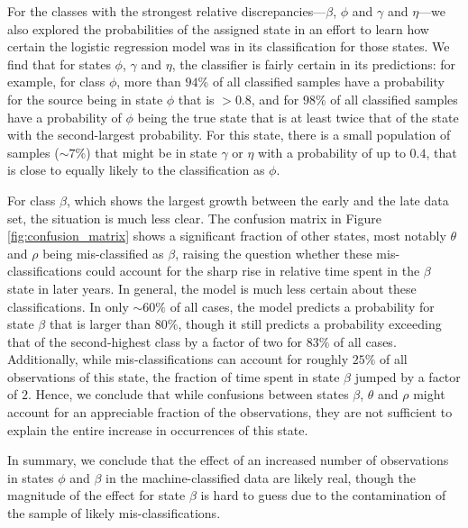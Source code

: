 \documentclass[fleqn,usenatbib]{mnras}
\begin{document}
For the classes with the strongest relative discrepancies---$\beta$, $\phi$ and $\gamma$ and $\eta$---we also explored the probabilities of the assigned state in an 
effort to learn how certain the logistic regression model was in its classification for those states. We find that for states $\phi$, $\gamma$ and $\eta$, the classifier is 
fairly certain in its predictions: for example, for class $\phi$, more than $94\%$ of all classified samples have a probability for the source being in state $\phi$ that is 
$>0.8$, and for $98\%$ of all classified samples have a probability of $\phi$ being the true state that is at least twice that of the state with the second-largest 
probability. For this state, there is a small population of samples ($\sim 7\%$) that might be in state $\gamma$ or $\eta$ with a probability of up to $0.4$, that is close to equally likely to the classification as $\phi$. 

For class $\beta$, which shows the largest growth between the early and the late data set, the situation is much less clear. The confusion matrix in Figure \ref{fig:confusion_matrix} shows a significant fraction of other states, most notably $\theta$ and $\rho$ being mis-classified as $\beta$, raising the question whether these mis-classifications could account for the sharp rise in relative time spent in the $\beta$ state in later years. In general, the model is much less certain about these classifications. In only $\sim 60\%$ of all cases, the model predicts a probability for state $\beta$ that is larger than $80\%$, though it still predicts a probability exceeding that of the second-highest class by a factor of two for $83\%$ of all cases. Additionally, while mis-classifications can account for roughly $25\%$ of all observations of this state, the fraction of time spent in state $\beta$ jumped by a factor of $2$. Hence, we conclude that while confusions between states $\beta$, $\theta$ and $\rho$ might account for an appreciable fraction of the observations, they are not sufficient to explain the entire increase in occurrences of this state. 

In summary, we conclude that the effect of an increased number of observations in states $\phi$ and $\beta$ in the machine-classified data are likely real, though the magnitude of the effect for state $\beta$ is hard to guess due to the contamination of the sample of likely mis-classifications.
\end{document}
